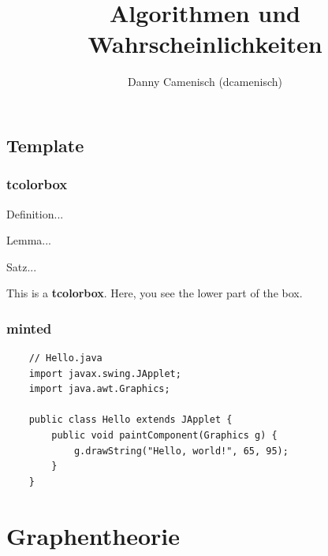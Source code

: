 \documentclass[a4paper]{report}
\title{Algorithmen und Wahrscheinlichkeiten}
\author{Danny Camenisch (dcamenisch)}
\begin{document}
\maketitle
\tableofcontents
\listofalgorithms



\chapter{Template}
\section{tcolorbox}

\begin{definition}
    Definition...
\end{definition}

\begin{lemma}
    Lemma...
\end{lemma}

\begin{satz}
    Satz...
\end{satz}

\begin{tcolorbox}[colback=dcWhite,colframe=dcOrange,title=\textbf{My Heading}]
    This is a \textbf{tcolorbox}.
\tcblower
    Here, you see the lower part of the box.
\end{tcolorbox}

\section{minted}

\begin{verbatim}
    // Hello.java
    import javax.swing.JApplet;
    import java.awt.Graphics;
    
    public class Hello extends JApplet {
        public void paintComponent(Graphics g) {
            g.drawString("Hello, world!", 65, 95);
        }    
    }
\end{verbatim}



\part{Graphentheorie}






\end{document}
